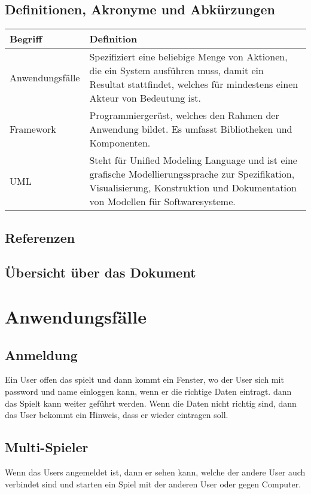 \documentclass[fontsize=12pt,paper=a4,twoside]{scrartcl}
\begin{document}
\subsection{Definitionen, Akronyme und Abkürzungen}
  \begin{tabular}{ |  l | p{12cm} |}
    \hline
    Begriff & Definition \\ \hline
    Anwendungsfälle & Spezifiziert eine beliebige Menge von Aktionen, die
ein System ausführen muss, damit ein Resultat stattfindet,
welches für mindestens einen Akteur von Bedeutung
ist. \\ \hline
    Framework &Programmiergerüst, welches den Rahmen der Anwendung
bildet. Es umfasst Bibliotheken und Komponenten. \\ \hline
    UML &Steht für Unified Modeling Language und ist eine grafische
Modellierungssprache zur Spezifikation, Visualisierung,
Konstruktion und Dokumentation von Modellen
für Softwaresysteme. \\
    \hline
    \end{tabular}

\subsection{Referenzen}

\subsection{Übersicht über das Dokument}

\newpage
\section{Anwendungsfälle} \label{sec:Anwendungsfälle}
\subsection{Anmeldung}
Ein User offen das spielt und dann kommt ein Fenster, wo der User sich  mit password und name einloggen  kann, wenn er die richtige Daten eintragt. dann das Spielt kann weiter geführt werden. Wenn die Daten nicht richtig sind, dann das User bekommt ein Hinweis, dass er wieder eintragen soll.
\subsection{Multi-Spieler}
Wenn das Users angemeldet ist, dann er sehen kann, welche der andere User auch verbindet sind und starten ein Spiel mit der anderen User oder gegen Computer.
\end{document}
